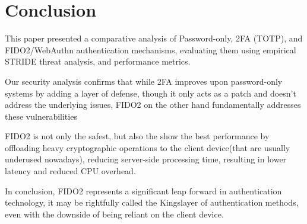 \section{Conclusion}

This paper presented a comparative analysis of Password-only, 2FA (TOTP), and FIDO2/WebAuthn authentication mechanisms, evaluating them using empirical STRIDE threat analysis, and performance metrics.

Our security analysis confirms that while 2FA improves upon password-only systems by adding a layer of defense, though it only acts as a patch and doesn't address the underlying issues, FIDO2 on the other hand fundamentally addresses these vulnerabilities 

FIDO2 is not only the safest, but also the show the best performance by offloading  heavy cryptographic operations to the client device(that are usually underused nowadays), reducing server-side processing time, resulting in lower latency and reduced CPU overhead.

In conclusion, FIDO2 represents a significant leap forward in authentication technology, it may be rightfully called the Kingslayer of authentication methods, even with the downside of being reliant on the client device.